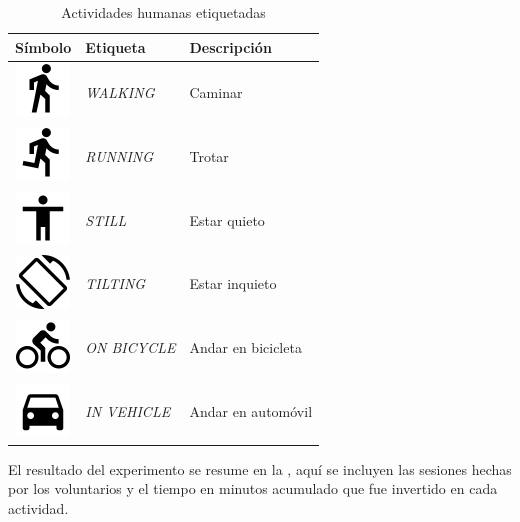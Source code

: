 \begin{table}[h]
\begin{centering}
\begin{tabular}[t]{|c|l|l|}
\hline 
Símbolo & Etiqueta & Descripción\tabularnewline
\hline 
\hline 
\includegraphics[scale=0.5]{capitulo-6/graphics/ic_activity_walk} & \emph{WALKING} & Caminar\tabularnewline
\hline 
\includegraphics[scale=0.5]{capitulo-6/graphics/ic_activity_run} & \emph{RUNNING} & Trotar\tabularnewline
\hline 
\includegraphics[scale=0.5]{capitulo-6/graphics/ic_activity_still} & \emph{STILL} & Estar quieto\tabularnewline
\hline 
\includegraphics[scale=0.5]{capitulo-6/graphics/ic_activity_tilt} & \emph{TILTING} & Estar inquieto\tabularnewline
\hline 
\includegraphics[scale=0.5]{capitulo-6/graphics/ic_activity_bike} & \emph{ON BICYCLE}  & Andar en bicicleta\tabularnewline
\hline 
\includegraphics[scale=0.5]{capitulo-6/graphics/ic_activity_car} & \emph{IN VEHICLE}  & \multirow{1}{*}{Andar en automóvil}\tabularnewline
\hline 
\end{tabular}
\par\end{centering}
\caption{\label{tab6:etiquetas}Actividades humanas etiquetadas}
\end{table}

El resultado del experimento se resume en la ,
aquí se incluyen las sesiones hechas por los voluntarios y el tiempo
en minutos acumulado que fue invertido en cada actividad. 

